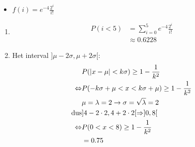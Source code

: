\documentclass[12pt]{report}
\begin{document}
\begin{itemize}[label={}]
{{\begin{itemize}
            \item {$f(i) = e^{-4}\frac{2^i}{i!}$}
        \end{itemize}
        \begin{enumerate}
         \item 
                \begin{equation*}
                    \begin{split}
                     P(i < 5) & = \sum_{i = 0}^{5}e^{-4}\frac{2^i}{i!}\\
                              & \approx 0.6228
                    \end{split}
                \end{equation*}
         \item
            Het interval $]\mu - 2\sigma, \mu + 2\sigma[$:
            \begin{equation*}
             \begin{split}
              & P(|x -\mu| < k\sigma) \geq 1 - \frac{1}{k^2} \\
               \Leftrightarrow & P(-k\sigma + \mu < x < k\sigma + \mu) \geq 1 - \frac{1}{k^2} \\
               & \mu = \lambda = 2 \rightarrow \sigma = \sqrt{\lambda} = 2 \\
               \hbox{dus} & ]4 - 2\cdot 2, 4 + 2\cdot 2[ \Rightarrow ]0, 8[ \\
               \Leftrightarrow & P(0 < x < 8) \geq 1 - \frac{1}{k^2} \\
                              & = 0.75\\
             \end{split}
            \end{equation*}

        \end{enumerate}

}}
\end{itemize}
\end{document}
